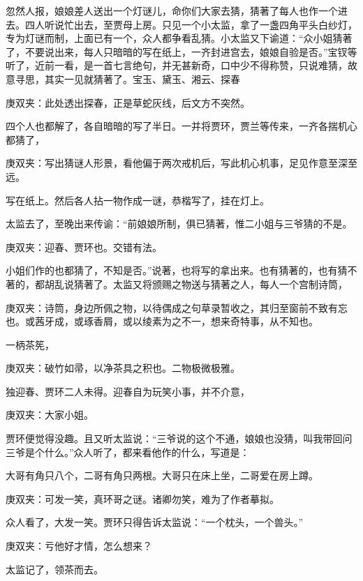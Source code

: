 \begin{parag}
    忽然人报，娘娘差人送出一个灯谜儿，命你们大家去猜，猜著了每人也作一个进去。四人听说忙出去，至贾母上房。只见一个小太监，拿了一盏四角平头白纱灯，专为灯谜而制，上面已有一个，众人都争看乱猜。小太监又下谕道：“众小姐猜著了，不要说出来，每人只暗暗的写在纸上，一齐封进宫去，娘娘自验是否。”宝钗等听了，近前一看，是一首七言绝句，并无甚新奇，口中少不得称赞，只说难猜，故意寻思，其实一见就猜著了。宝玉、黛玉、湘云、探春\begin{note}庚双夹：此处透出探春，正是草蛇灰线，后文方不突然。\end{note}四个人也都解了，各自暗暗的写了半日。一并将贾环，贾兰等传来，一齐各揣机心都猜了，\begin{note}庚双夹：写出猜谜人形景，看他偏于两次戒机后，写此机心机事，足见作意至深至远。\end{note}写在纸上。然后各人拈一物作成一谜，恭楷写了，挂在灯上。
\end{parag}


\begin{parag}
    太监去了，至晚出来传谕：“前娘娘所制，俱已猜著，惟二小姐与三爷猜的不是。\begin{note}庚双夹：迎春、贾环也。交错有法。\end{note}小姐们作的也都猜了，不知是否。”说著，也将写的拿出来。也有猜著的，也有猜不著的，都胡乱说猜著了。太监又将颁赐之物送与猜著之人，每人一个宫制诗筒，\begin{note}庚双夹：诗筒，身边所佩之物，以待偶成之句草录暂收之，其归至窗前不致有忘也。或茜牙成，或琢香屑，或以绫素为之不一，想来奇特事，从不知也。\end{note}一柄茶筅，\begin{note}庚双夹：破竹如帚，以净茶具之积也。二物极微极雅。\end{note}独迎春、贾环二人未得。迎春自为玩笑小事，并不介意，\begin{note}庚双夹：大家小姐。\end{note}贾环便觉得没趣。且又听太监说：“三爷说的这个不通，娘娘也没猜，叫我带回问三爷是个什么。”众人听了，都来看他作的什么，写道是：
\end{parag}


\begin{parag}
    大哥有角只八个，二哥有角只两根。大哥只在床上坐，二哥爱在房上蹲。\begin{note}庚双夹：可发一笑，真环哥之谜。诸卿勿笑，难为了作者摹拟。\end{note}
\end{parag}


\begin{parag}
    众人看了，大发一笑。贾环只得告诉太监说：“一个枕头，一个兽头。”\begin{note}庚双夹：亏他好才情，怎么想来？\end{note}太监记了，领茶而去。
\end{parag}


